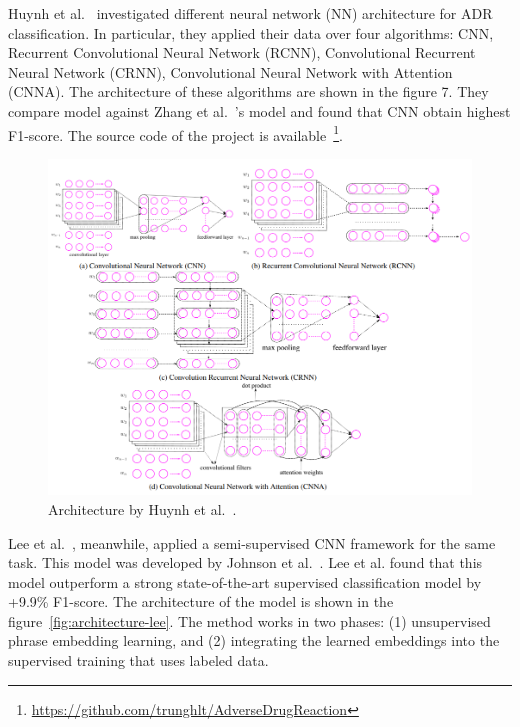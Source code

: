 Huynh et al.~\cite{huynh2016adverse} investigated different neural network (NN) architecture for ADR classification. In particular, they applied their data over four algorithms: CNN, Recurrent Convolutional Neural Network (RCNN), Convolutional Recurrent Neural Network (CRNN), Convolutional Neural Network with Attention (CNNA). The architecture of these algorithms are shown in the figure 7. They compare model against Zhang et al.~\cite{zhang2016ensemble}’s model and found that CNN obtain highest F1-score. The source code of the project is available~\footnote{\url{https://github.com/trunghlt/AdverseDrugReaction}}.

\begin{figure}[h]
	\centering
	\includegraphics[width=0.99\linewidth]{Figures/e.png}
	\caption{Architecture by Huynh et al.~\cite{huynh2016adverse}.}
	\label{fig:architecture-huynh}
\end{figure}

Lee et al.~\cite{lee2017adverse}, meanwhile, applied a semi-supervised CNN framework for the same task. This model was developed by Johnson et al.~\cite{johnson2015semi}. Lee et al. found that this model outperform a strong state-of-the-art supervised classification model by +9.9\% F1-score. The architecture of the model is shown in the figure~\ref{fig:architecture-lee}. The method works in two phases: (1) unsupervised phrase embedding learning, and (2) integrating the learned embeddings into the supervised training that uses labeled data.

